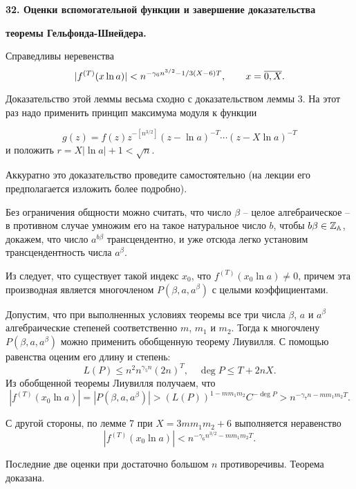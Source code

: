 \vskip 5mm
\centerline{\bf { 32. Оценки вспомогательной функции и завершение доказательства}}
\centerline{\bf {теоремы Гельфонда-Шнейдера. }}
\vskip 5mm


 Справедливы неревенства
$$
|f^{(T)}(x \ln a)| < n^{-\gamma_6n^{3/2}-1/3(X-6)T}, \qquad x=\overline{0,X}.
$$
\endproclaim

Доказательство этой леммы весьма сходно с доказательством леммы 3. На этот
раз надо применить принцип максимума модуля к функции

$$
g(z)=f(z)z^{-[n^{3/2}]}(z-\ln a)^{-T} \cdots (z-X\ln a)^{-T}
$$
и положить $r=X|\ln a|+1<\sqrt n$.

Аккуратно это доказательство проведите самостоятельно (на лекции его    \linebreak
предполагается изложить более подробно).

 Без ограничения общности
можно считать, что число $\beta$ -- целое алгебраическое -- в противном случае
умножим его на такое натуральное число $b$,  чтобы
$b\beta \in \Bbb Z_{\Bbb A}$,  докажем, что число $a^{b\beta}$ трансцендентно,
и уже отсюда легко установим трансцендентность числа $a^{\beta}$.

 Из  следует, что существует
такой индекс $x_0$, что $f^{(T)}(x_0\ln a) \ne 0$, причем эта производная является
многочленом $P(\beta, a, a^{\beta})$ с целыми коэффициентами.

Допустим, что при выполненных условиях теоремы все три числа
$\beta$, $a$   и $a^{\beta}$  алгебраические степеней
соответственно $m$, $m_1$ и  $m_2$. Тогда
к многочлену $P(\beta, a, a^{\beta}) $ можно применить обобщенную теорему
Лиувилля. С помощью равенства  оценим его длину и степень:
$$
L(P) \le n^2n^{\gamma_5n}(2n)^T, \quad \deg P \le T+2nX.
$$
Из обобщенной теоремы Лиувилля получаем, что
$$
|f^{(T)}(x_0\ln a)|=|P(\beta, a, a^{\beta})|> (L(P))^{1-mm_1m_2}C^{-\deg P} >
n^{-\gamma_7n-mm_1m_2T}.
$$

С другой стороны, по лемме 7 при $X=3mm_1m_2+6$ выполняется неравенство
$$
|f^{(T)}(x_0\ln a)| <n^{-\gamma_6n^{3/2}-mm_1m_2T}.
$$

Последние две оценки при достаточно большом $n$ противоречивы. Теорема
доказана.
\enddemo


